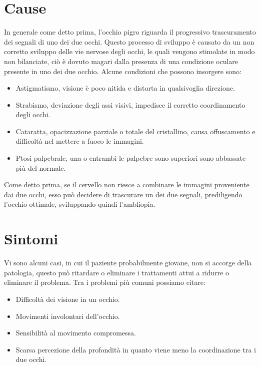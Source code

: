 \documentclass[
a4paper,
cleardoublepage=empty,
headings=twolinechapter,
numbers=autoenddot,
]{scrbook}
\begin{document}
	\section{Cause}
	In generale come detto prima, l'occhio pigro riguarda il progressivo trascuramento dei segnali di uno dei due occhi.
	Questo processo di sviluppo è causato da un non corretto sviluppo delle vie nervose degli occhi, le quali vengono stimolate in modo non bilanciate, ciò è dovuto magari dalla presenza di una condizione oculare presente in uno dei due occhio.
	Alcune condizioni che possono insorgere sono:
	\begin{itemize}
		\item Astigmatismo, visione è poco nitida e distorta in qualsivoglia direzione.
		\item Strabismo, deviazione degli assi visivi, impedisce il corretto coordinamento degli occhi. 
		\item Cataratta, opacizzazione parziale o totale del cristallino,  causa offuscamento e difficoltà nel mettere a fuoco le immagini.
		\item Ptosi palpebrale, una o entrambi le palpebre sono superiori sono abbassate più del normale.
	\end{itemize}
	Come detto prima, se il cervello non riesce a combinare le immagini proveniente dai due occhi, esso può decidere di trascurare un dei due segnali, prediligendo l'occhio ottimale, sviluppando quindi l'ambliopia.
	\section{Sintomi}
	Vi sono alcuni casi, in cui il paziente probabilmente giovane, non si accorge della patologia, questo può ritardare o eliminare i trattamenti attui a ridurre o eliminare il problema.
	Tra i problemi più comuni possiamo citare:	   
	\begin{itemize}
		\item Difficoltà dei visione in un occhio.
		\item Movimenti involontari dell'occhio.
		\item Sensibilità al movimento compromessa.
		\item Scarsa percezione della profondità in quanto viene meno la coordinazione tra i due occhi.
	\end{itemize}    
\end{document}
